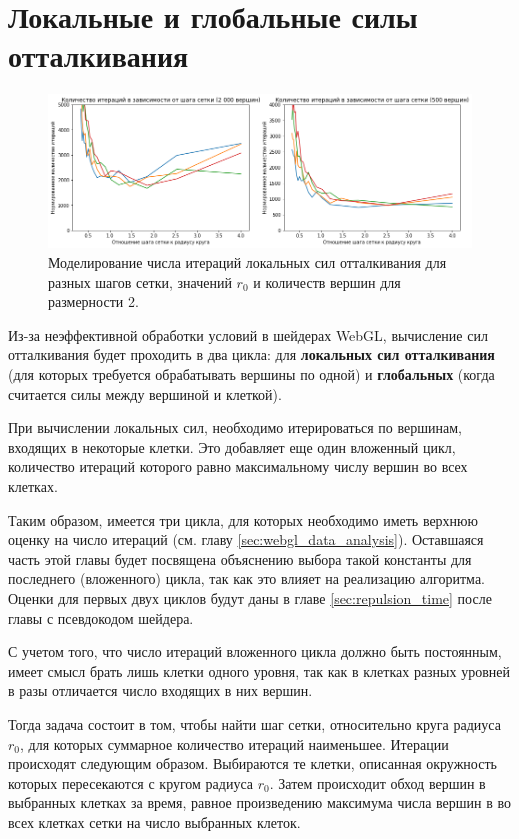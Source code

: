 \section{Локальные и глобальные силы отталкивания}
\label{sec:iter_estimate}

\begin{figure}[t]
  \centering
  \includegraphics[width=\textwidth]{grid_step_2.png}
  \caption{Моделирование числа итераций локальных сил отталкивания для разных шагов сетки, значений $r_0$ и количеств вершин для размерности 2.}
  \label{fig:grid_step}
\end{figure}

Из-за неэффективной обработки условий в шейдерах WebGL, вычисление сил отталкивания будет проходить в два цикла: для {\bfseries локальных сил отталкивания} (для которых требуется обрабатывать вершины по одной) и {\bfseries глобальных} (когда считается силы между вершиной и клеткой).

При вычислении локальных сил, необходимо итерироваться по вершинам, входящих в некоторые клетки. Это добавляет еще один вложенный цикл, количество итераций которого равно максимальному числу вершин во всех клетках.

Таким образом, имеется три цикла, для которых необходимо иметь верхнюю оценку на число итераций (см. главу \ref{sec:webgl_data_analysis}). Оставшаяся часть этой главы будет посвящена объяснению выбора такой константы для последнего (вложенного) цикла, так как это влияет на реализацию алгоритма. Оценки для первых двух циклов будут даны в главе \ref{sec:repulsion_time} после главы с псевдокодом шейдера.

С учетом того, что число итераций вложенного цикла должно быть постоянным, имеет смысл брать лишь клетки одного уровня, так как в клетках разных уровней в разы отличается число входящих в них вершин.

Тогда задача состоит в том, чтобы найти шаг сетки, относительно круга радиуса $r_0$, для которых суммарное количество итераций наименьшее. Итерации происходят следующим образом. Выбираются те клетки, описанная окружность которых пересекаются с кругом радиуса $r_0$. Затем происходит обход вершин в выбранных клетках за время, равное произведению максимума числа вершин в во всех клетках сетки на число выбранных клеток.

